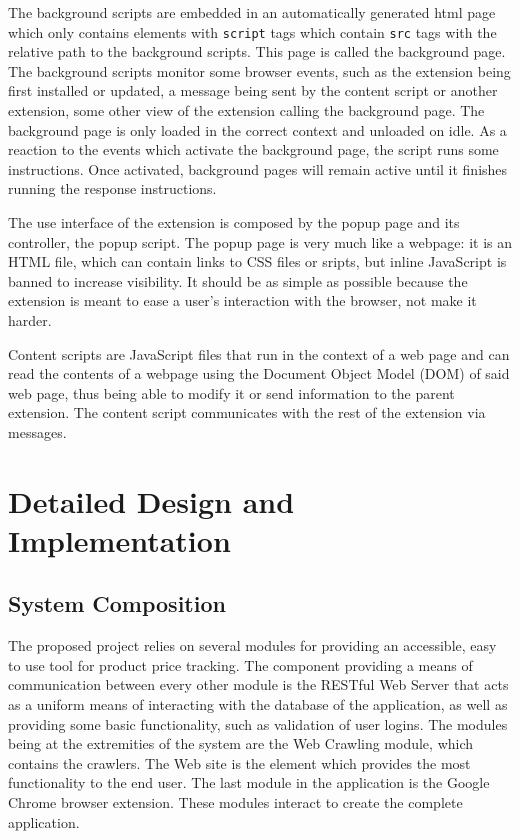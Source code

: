 \documentclass[12pt,a4paper,twoside]{report}
\begin{document}
The background scripts are embedded in an automatically generated html page which only contains elements with \lstinline$script$ tags which contain \lstinline$src$ tags with the relative path to the background scripts. This page is called the background page. The background scripts monitor some browser events, such as the extension being first installed or updated, a message being sent by the content script or another extension, some other view of the extension calling the background page. The background page is only loaded in the correct context and unloaded on idle. As a reaction to the events which activate the background page, the script runs some instructions. Once activated, background pages will remain active until it finishes running the response instructions.

The use interface of the extension is composed by the popup page and its controller, the popup script. The popup page is very much like a webpage: it is an HTML file, which can contain links to CSS files or sripts, but inline JavaScript is banned to increase visibility. It should be as simple as possible because the extension is meant to ease a user's interaction with the browser, not make it harder.

Content scripts are JavaScript files that run in the context of a web page and can read the contents of a webpage using the Document Object Model (DOM) of said web page, thus being able to modify it or send information to the parent extension. The content script communicates with the rest of the extension via messages.


\chapter{Detailed Design and Implementation}

\section{System Composition}

The proposed project relies on several modules for providing an accessible, easy to use tool for product price tracking. The component providing a means of communication between every other module is the RESTful Web Server that acts as a uniform means of interacting with the database of the application, as well as providing some basic functionality, such as validation of user logins. The modules being at the extremities of the system are the Web Crawling module, which contains the crawlers. The Web site is the element which provides the most functionality to the end user. The last module in the application is the Google Chrome browser extension. These modules interact to create the complete application.
\end{document}
